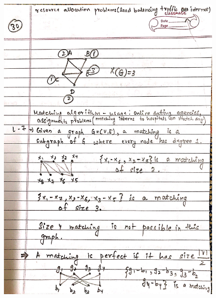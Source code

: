 \begin{figure}[H]
    \centering
    \includegraphics[scale=0.25]{"./MIT 6.042J/MIT_6042J_030"}
\end{figure}
\newpage
